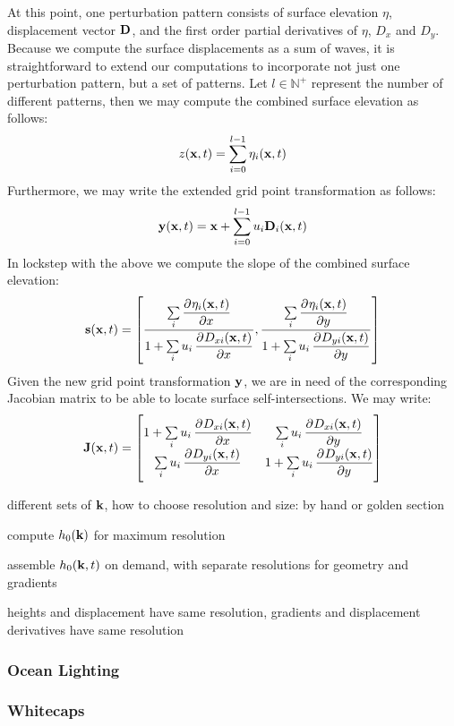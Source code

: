 At this point, one perturbation pattern consists of surface elevation $\eta$, 
displacement vector $\mathbf{D}$, and the first order partial derivatives of
$\eta$, $D_x$ and $D_y$. Because we compute the surface displacements as a sum
of waves, it is straightforward to extend our computations to incorporate not
just one perturbation pattern, but a set of patterns. Let
$l \in \mathbb{N}^+$ represent the number of different patterns, then we may
compute the combined surface elevation as follows:
\begin{equation}
 z(\mathbf{x},t) = \sum\limits_{i=0}^{l-1}\eta_i(\mathbf{x},t)
\end{equation}
Furthermore, we may write the extended grid point transformation as follows:
\begin{equation}
\mathbf{y}(\mathbf{x},t) = \mathbf{x}+\sum\limits_{i=0}^{l-1}u_i\mathbf{D}_i(\mathbf{x},t) 
\end{equation}
In lockstep with the above we compute the slope of the combined surface elevation:
\begin{equation}
\mvec{s}(\mvec{x},t) = \left[\frac{\sum\limits_i \dpd{\eta_i(\mvec{x},t)}{x}}{1 
+ \sum\limits_i u_i \dpd{D_{xi}(\mvec{x},t)}{x}}, \frac{\sum\limits_i 
\dpd{\eta_i(\mvec{x},t)}{y}}{1 + \sum\limits_i 
u_i\dpd{D_{yi}(\mvec{x},t)}{y}}\right]
\end{equation}
Given the new grid point transformation $\mathbf{y}$, we are in need of the corresponding
Jacobian matrix to be able to locate surface self-intersections. We may write:
\begin{equation}
 \mvec{J}(\mvec{x},t) =
 \begin{bmatrix}
   1 + \sum\limits_i u_i\dpd{D_{xi}(\mvec{x},t)}{x} & \sum\limits_i u_i\dpd{D_{xi}(\mvec{x},t)}{y} \\
   \sum\limits_i u_i\dpd{D_{yi}(\mvec{x},t)}{x} & 1 + \sum\limits_i u_i\dpd{D_{yi}(\mvec{x},t)}{y}
 \end{bmatrix}
\end{equation}

different sets of $\mathbf{k}$, how to choose resolution and size: by hand or 
golden section


compute $h_0(\mathbf{k})$ for maximum resolution


assemble $h_0(\mathbf{k},t)$ on demand, with separate resolutions for geometry 
and gradients

heights and displacement have same resolution, gradients and displacement 
derivatives have same resolution

\subsubsection{Ocean Lighting}
\cite{article:oceanlighting}
\subsubsection{Whitecaps}
\cite{article:whitecaps}